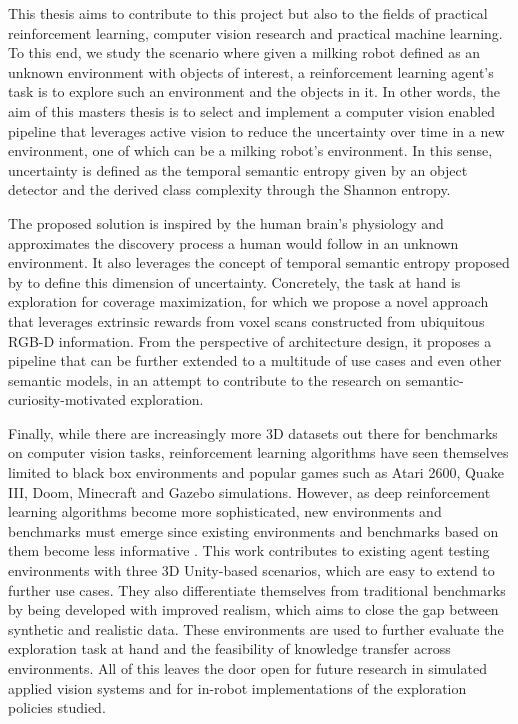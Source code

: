 This thesis aims to contribute to this project but also to the fields of practical reinforcement learning, computer vision research and practical machine learning. To this end, we study the scenario where given a milking robot defined as an unknown environment with objects of interest, a reinforcement learning agent's task is to explore such an environment and the objects in it.
In other words, the aim of this masters thesis is to select and implement a computer vision enabled pipeline that leverages active vision to reduce the uncertainty over time in a new environment, one of which can be a milking robot's environment. In this sense, uncertainty is defined as the temporal semantic entropy given by an object detector and the derived class complexity through the Shannon entropy. 

The proposed solution is inspired by the human brain's physiology and approximates the discovery process a human would follow in an unknown environment. It also leverages the concept of temporal semantic entropy proposed by \textcite{chaplot2020semantic} to define this dimension of uncertainty. Concretely, the task at hand is exploration for coverage maximization, for which we propose a novel approach that leverages extrinsic rewards from voxel scans constructed from ubiquitous RGB-D information. From the perspective of architecture design, it proposes a pipeline that can be further extended to a multitude of use cases and even other semantic models, in an attempt to contribute to the research on semantic-curiosity-motivated exploration.

Finally, while there are increasingly more 3D datasets out there for benchmarks on computer vision tasks, reinforcement learning algorithms have seen themselves limited to black box environments and popular games such as Atari 2600, Quake III, Doom, Minecraft and Gazebo simulations. However, as deep reinforcement learning algorithms become more sophisticated, new environments and benchmarks must emerge since existing environments and benchmarks based on them become less informative \cite{juliani2018unity}. This work contributes to existing agent testing environments with three 3D Unity-based scenarios, which are easy to extend to further use cases. They also differentiate themselves from traditional benchmarks by being developed with improved realism, which aims to close the gap between synthetic and realistic data. These environments are used to further evaluate the exploration task at hand and the feasibility of knowledge transfer across environments. All of this leaves the door open for future research in simulated applied vision systems and for in-robot implementations of the exploration policies studied.

